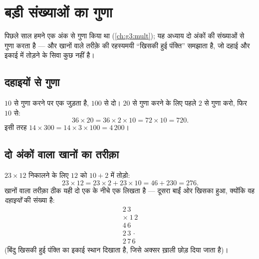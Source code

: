 \chapter{बड़ी संख्याओं का गुणा}\label{ch:g4:mult}

पिछले साल हमने एक अंक से गुणा किया था (\cref{ch:g3:mult}); यह
अध्याय दो अंकों की संख्याओं से गुणा करता है --- और खानों वाले
तरीक़े की रहस्यमयी ``खिसकी हुई पंक्ति'' समझाता है, जो दहाई और
इकाई में तोड़ने के सिवा कुछ नहीं है।

\section{दहाइयों से गुणा}

\begin{proposition}[10, 20, 300 आदि से गुणा]\label{prop:g4:mult:tens}
$10$ से गुणा करने पर एक  जुड़ता है, $100$ से दो। $20$ से
गुणा करने के लिए पहले $2$ से गुणा करो, फिर $10$ से:
\[
36 \times 20 = 36 \times 2 \times 10 = 72 \times 10 = 720 .
\]
इसी तरह $14 \times 300 = 14 \times 3 \times 100 = 4\,200$।
\end{proposition}
\admitted

\section{दो अंकों वाला खानों का तरीक़ा}

\begin{example}[खिसकी हुई पंक्ति क्यों?]\label{ex:g4:mult:why}
$23 \times 12$ निकालने के लिए $12$ को $10 + 2$ में तोड़ो:
\[
23 \times 12 = 23 \times 2 + 23 \times 10 = 46 + 230 = 276 .
\]
खानों वाला तरीक़ा ठीक यही दो  एक के नीचे एक लिखता है ---
दूसरा बाईं ओर खिसका हुआ, क्योंकि वह \emph{दहाइयों} की संख्या
है:
\[
\begin{array}{r}
2\,3 \\
\times\ 1\,2 \\
\hline
4\,6 \\
2\,3\,\cdot \\
\hline
2\,7\,6
\end{array}
\]
(बिंदु खिसकी हुई पंक्ति का इकाई स्थान दिखाता है, जिसे अक्सर
ख़ाली छोड़ दिया जाता है)।
\end{example}

